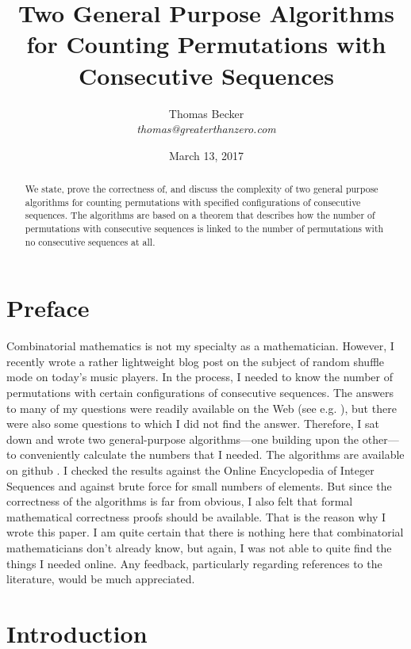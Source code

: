 \documentclass{article}
\begin{document}
\author{Thomas Becker\\ {\small \it thomas@greaterthanzero.com}}
\title{Two General Purpose Algorithms for Counting Permutations with Consecutive Sequences}
\date{\small March 13, 2017}
\maketitle

\begin{abstract}
  We state, prove the correctness of, and discuss the complexity of two general
  purpose algorithms for counting permutations with specified configurations of
  consecutive sequences. The algorithms are based on a theorem that describes how
  the number of permutations with consecutive sequences is linked to the number of
  permutations with no consecutive sequences at all.
\end{abstract}

\section{Preface}
Combinatorial mathematics is not my specialty as a mathematician. However, I recently wrote
a rather lightweight blog post \cite{BlogPost} on the subject of random shuffle mode on today's
music players. In the process, I needed to know the number of permutations with certain
configurations of consecutive sequences. The answers to many of my questions were readily
available on the Web (see e.g. \cite{Oeis}),
but there were also some questions to which I did not find the answer. Therefore, I sat down
and wrote two general-purpose algorithms---one building upon the other---to conveniently
calculate the numbers that I needed. The algorithms are available on github \cite{Algos}.
I checked the results against the Online Encyclopedia of Integer Sequences \cite{Oeis} and
against brute force for small numbers of elements. But since the correctness of the algorithms
is far from obvious, I also felt that formal mathematical correctness proofs should be available.
That is the reason why I wrote this paper. I am quite certain that there is nothing here that
combinatorial mathematicians don't already know, but again, I was not able to quite find the things I
needed online. Any feedback, particularly regarding references to
the literature, would be much appreciated.

\section{Introduction}
\end{document}
